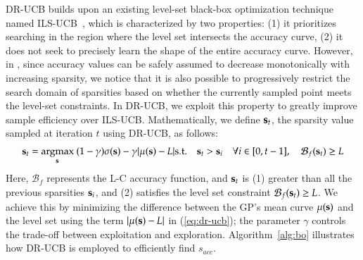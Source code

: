 DR-UCB builds upon an existing level-set black-box optimization technique named ILS-UCB~\cite{garg2016tumor}, %
which is characterized by two properties: (1) it prioritizes searching in the region where the level set intersects the accuracy curve, (2) it does not seek to precisely learn the shape of the entire accuracy curve. However, in \algoName, since accuracy values can be safely assumed to decrease monotonically with increasing sparsity, we notice that it is also possible to progressively restrict the search domain of sparsities based on whether the currently sampled point meets the level-set constraints. In DR-UCB, we exploit this property to greatly improve sample efficiency over ILS-UCB. Mathematically, we define ${\bf s}_t$, the sparsity value sampled at iteration $t$ using DR-UCB, as follows:
\begin{multline}
{\bf s}_t = \underset{{\bf s}_{}}{\text{argmax}}~(1 - \gamma) \sigma({\bf s}) - \gamma | \mu({\bf s}) - L|
    \text{s.t.} \quad {\bf s}_t > {\bf s}_{i} \quad \forall i \in [0, t-1], \quad \mathcal{B}_f({\bf s}_t)  \ge  L
    \label{eq:dr-ucb}
\end{multline}
Here, $\mathcal{B}_f$ represents the L-C accuracy function, and ${\bf s}_t$ is (1) greater than all the previous sparsities ${\bf s}_i$, and (2) satisfies the level set constraint $\mathcal{B}_f({\bf s}_t)  \ge  L$. We achieve this by minimizing the difference between the GP's mean curve $\mu({\bf s})$ and the level set using the term $|\mu({\bf s}) - L|$ in (\ref{eq:dr-ucb});
the parameter $\gamma$ controls the trade-off between exploitation and exploration.
%
%
Algorithm~\ref{alg:bo} illustrates how DR-UCB is employed to efficiently find $s_{acc}$.

\newcommand\CONDITION[2]%
  {\begin{tabular}[t]{@{}l@{}l@{}}
     #1&#2
   \end{tabular}%
  }
  
